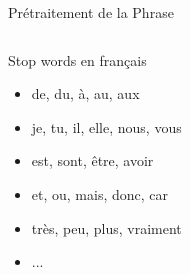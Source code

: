 \documentclass[aspectratio=169,11pt]{beamer}
\begin{document}
\begin{frame}{Prétraitement de la Phrase}
\begin{columns}
\begin{column}{0.4\textwidth}
\begin{alertblock}{Stop words en français}
\begin{itemize}
                    \item de, du, à, au, aux
                    \item je, tu, il, elle, nous, vous
                    \item est, sont, être, avoir
                    \item et, ou, mais, donc, car
                    \item très, peu, plus, vraiment
                    \item ...
                \end{itemize}
            \end{alertblock}
        \end{column}
    \end{columns}
\end{frame}
\end{document}
